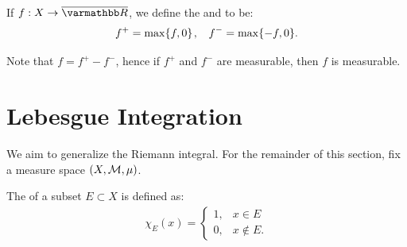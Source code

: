 \begin{definition}
    If $f:X \rightarrow \overline{\bfR}$, we define the  and  to be:
        \begin{equation*}
        \begin{split}
            f^+ = \max\{f,0\} \h1,\h9 f^- = \max \{-f,0\}.
        \end{split}
        \end{equation*}
\end{definition}

Note that $f = f^+ - f^-$, hence if  $f^+$ and $f^-$ are measurable, then $f$ is measurable.

\section{Lebesgue Integration}

We aim to generalize the Riemann integral. For the remainder of this section, fix a measure space $(X,\cM,\mu)$.

\begin{definition}
    The  of a subset $E \subset X$ is defined as:
        \begin{equation*}
        \begin{split}
            \chi_E(x) = \begin{cases}
            1, & x\in E \\
            0, & x \not\in E.
            \end{cases} 
        \end{split}
        \end{equation*}
\end{definition}

